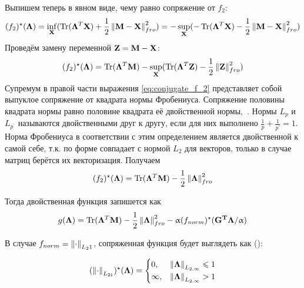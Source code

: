 Выпишем теперь в явном виде, чему равно сопряжение от $f_2$:
\begin{equation*}
    (f_2)^{\star}(\mathbf{\Lambda}) =
    \inf_{\mathbf{X}}(\operatorname*{Tr}(\mathbf{\Lambda}^T\mathbf{X}) + \frac{1}{2}\left\lVert\mathbf{M} - \mathbf{X}\right\rVert_{fro}^2) =
    - \sup_{\mathbf{X}}(- \operatorname*{Tr}(\mathbf{\Lambda}^T\mathbf{X}) - \frac{1}{2}\left\lVert\mathbf{M} - \mathbf{X}\right\rVert_{fro}^2)
\end{equation*}
Проведём замену переменной $\mathbf{Z} = \mathbf{M} - \mathbf{X}$:
\begin{equation}
    (f_2)^{\star}(\mathbf{\Lambda}) =
    \operatorname*{Tr}(\mathbf{\Lambda}^T\mathbf{M}) - \sup_{\mathbf{X}}(\operatorname*{Tr}(\mathbf{\Lambda}^T\mathbf{Z}) - \frac{1}{2}\left\lVert\mathbf{Z}\right\rVert_{fro}^2)
    \label{eq:conjugate_f_2}
\end{equation}
Супремум в правой части выражения \ref{eq:conjugate_f_2} представляет собой выпуклое сопряжение
от квадрата нормы Фробениуса. Сопряжение половины квадрата нормы равно половине квадрата её двойственной нормы,~\cite{Boyd, gramfort_2012}.
Нормы $L_p$ и $L_{p^{\prime}}$ называются двойственными друг к другу, если для них выполнено $\frac{1}{p} + \frac{1}{p^{\prime}} = 1$.
Норма Фробениуса в соответствии с этим определением является двойственной к самой себе, т.к. по форме совпадает с нормой $L_2$ для векторов, только в
случае матриц берётся их векторизация. Получаем
\begin{equation}
    (f_2)^{\star}(\mathbf{\Lambda}) =
    \operatorname*{Tr}(\mathbf{\Lambda}^T\mathbf{M}) - \frac{1}{2}\left\lVert\mathbf{\Lambda}\right\rVert^2_{fro}
\end{equation}

Тогда двойственная функция запишется как 
\begin{equation}
    g(\mathbf{\Lambda}) =
    \operatorname*{Tr}(\mathbf{\Lambda}^T\mathbf{M}) - \frac{1}{2}\left\lVert\mathbf{\Lambda}\right\rVert^2_{fro} - \upalpha (f_{norm})^{\star}(\mathbf{G^T\Lambda}/\upalpha)
    \label{eq:dual_func}
\end{equation}

В случае $f_{norm} = \left\lVert\cdot\right\rVert_{L_21}$, сопряженная функция будет выглядеть как (\cite{gramfort_2012}):

\begin{equation}
    (\left\lVert\cdot\right\rVert_{L_{21}})^{\star}(\mathbf{\Lambda}) = 
    \begin{cases}
        0, & \left\lVert\mathbf{\Lambda}\right\rVert_{L_{2,\infty}} \leqslant 1\\
        \infty, & \left\lVert\mathbf{\Lambda}\right\rVert_{L_{2,\infty}} > 1
    \end{cases}
\end{equation}

